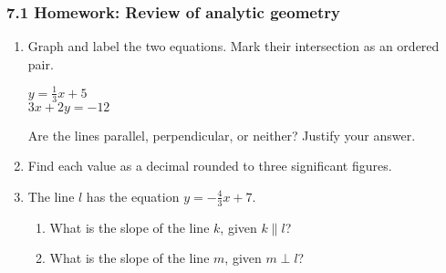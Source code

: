 

\fancyhead[LE]{\thepage}



\subsubsection*{7.1 Homework: Review of analytic geometry}
\begin{enumerate}
  \item Graph and label the two equations. Mark their intersection as an ordered pair.
  \begin{multicols}{2}
    $y = \frac{1}{3}x+5$ \\
    $3x+2y = -12$
  \end{multicols}
  Are the lines parallel, perpendicular, or neither? Justify your answer.
  \vspace{1.5cm}
  \begin{center} %
  \end{center}

\item Find each value as a decimal rounded to three significant figures.
  \begin{enumerate}
  \end{enumerate}
  \vspace{0.5cm}

\newpage
\item The line $l$ has the equation $y=-\frac{4}{3} x+7$.
\begin{enumerate}
  \item What is the slope of the line $k$, given $k \parallel l$?
  \vspace{1.5cm}
  \item What is the slope of the line $m$, given $m \perp l$?
  \vspace{1.5cm}
\end{enumerate}


\end{enumerate}
